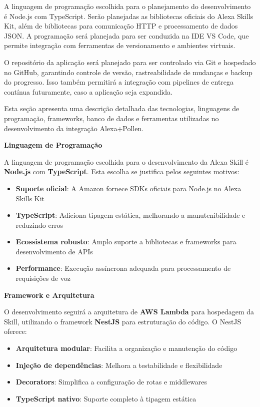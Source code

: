 A linguagem de programação escolhida para o planejamento do desenvolvimento é Node.js com TypeScript. 
Serão planejadas as bibliotecas oficiais do Alexa Skills Kit, além de bibliotecas para comunicação HTTP e processamento de dados JSON. 
A programação será planejada para ser conduzida na IDE VS Code, que permite integração com ferramentas de versionamento e ambientes virtuais.

O repositório da aplicação será planejado para ser controlado via Git e hospedado no GitHub, garantindo controle de versão, rastreabilidade de mudanças e backup do progresso. 
Isso também permitirá a integração com pipelines de entrega contínua futuramente, caso a aplicação seja expandida.

\label{sssec:descricao-tecnica}

Esta seção apresenta uma descrição detalhada das tecnologias, linguagens de programação, frameworks, banco de dados e ferramentas utilizadas no desenvolvimento da integração Alexa+Pollen.

\textbf{Linguagem de Programação}

A linguagem de programação escolhida para o desenvolvimento da Alexa Skill é \textbf{Node.js} com \textbf{TypeScript}. Esta escolha se justifica pelos seguintes motivos:

\begin{itemize}
    \item \textbf{Suporte oficial}: A Amazon fornece SDKs oficiais para Node.js no Alexa Skills Kit
    \item \textbf{TypeScript}: Adiciona tipagem estática, melhorando a manutenibilidade e reduzindo erros
    \item \textbf{Ecossistema robusto}: Amplo suporte a bibliotecas e frameworks para desenvolvimento de APIs
    \item \textbf{Performance}: Execução assíncrona adequada para processamento de requisições de voz
\end{itemize}

\textbf{Framework e Arquitetura}

O desenvolvimento seguirá a arquitetura de \textbf{AWS Lambda} para hospedagem da Skill, utilizando o framework \textbf{NestJS} para estruturação do código. O NestJS oferece:

\begin{itemize}
    \item \textbf{Arquitetura modular}: Facilita a organização e manutenção do código
    \item \textbf{Injeção de dependências}: Melhora a testabilidade e flexibilidade
    \item \textbf{Decorators}: Simplifica a configuração de rotas e middlewares
    \item \textbf{TypeScript nativo}: Suporte completo à tipagem estática
\end{itemize}

